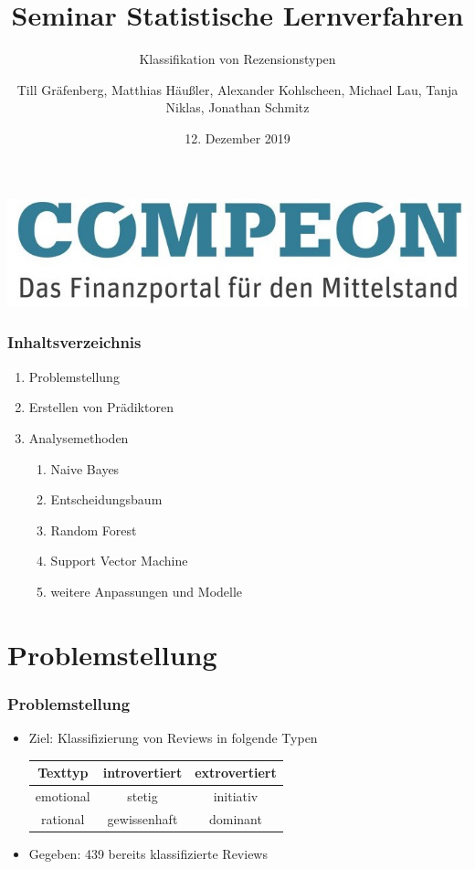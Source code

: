 \documentclass{beamer}
\title{Seminar Statistische Lernverfahren}
\subtitle{Klassifikation von Rezensionstypen}
\author[T.G., M.H., A.K., M.L., T.N., J.S.]{Till Gräfenberg, Matthias Häußler, Alexander Kohlscheen, Michael Lau, Tanja Niklas, Jonathan Schmitz}
\date{12. Dezember 2019}
\begin{document}
\begin{frame}
\thispagestyle{empty}
\begin{flushright}
\includegraphics[scale=0.2]{compeon.png}
\end{flushright}
\titlepage
\end{frame}
\begin{frame}
\addtocounter{framenumber}{-1}
\frametitle{Inhaltsverzeichnis}
\begin{enumerate}\itemsep10pt
\item Problemstellung
\item Erstellen von Prädiktoren
\item Analysemethoden
	\begin{enumerate}
	\item Naive Bayes
	\item Entscheidungsbaum
	\item Random Forest
	\item Support Vector Machine
	\item weitere Anpassungen und Modelle
	\end{enumerate}
\end{enumerate}
\end{frame}
\section{Problemstellung}
\begin{frame}
\frametitle{Problemstellung}
\begin{itemize}\setlength\parskip{12pt}
\item Ziel: Klassifizierung von Reviews in folgende Typen
\begin{center}
\begin{tabular}{c|c|c}
Texttyp & introvertiert & extrovertiert \\
\hline 
emotional & stetig & initiativ\\
rational & gewissenhaft & dominant
\end{tabular}
\end{center}
\item Gegeben: 439 bereits klassifizierte Reviews
\end{itemize}
\end{frame}
\end{document}
